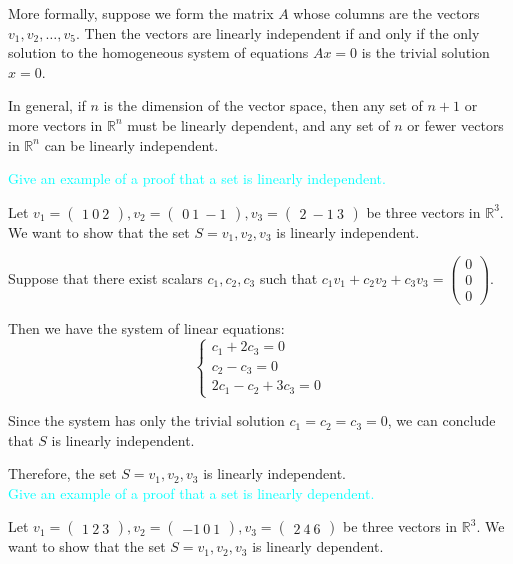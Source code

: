 \documentclass[fontsize=12pt]{scrartcl}
\begin{document}
\noindent
More formally, suppose we form the matrix $A$ whose columns are the vectors $v_1, v_2, \ldots, v_5$. Then the vectors are linearly independent if and only if the only solution to the homogeneous system of equations $Ax=0$ is the trivial solution $x=0$.

\noindent
In general, if $n$ is the dimension of the vector space, then any set of $n+1$ or more vectors in $\mathbb{R}^n$ must be linearly dependent, and any set of $n$ or fewer vectors in $\mathbb{R}^n$ can be linearly independent.

\newpage

\noindent
\textcolor{cyan}{Give an example of a proof that a set is linearly independent.}

\noindent
Let $v_1 = \begin{pmatrix} 1 \ 0 \ 2 \end{pmatrix}, v_2 = \begin{pmatrix} 0 \ 1 \ -1 \end{pmatrix}, v_3 = \begin{pmatrix} 2 \ -1 \ 3 \end{pmatrix}$ be three vectors in $\mathbb{R}^3$. We want to show that the set $S = {v_1, v_2, v_3}$ is linearly independent.

\noindent
Suppose that there exist scalars $c_1, c_2, c_3$ such that $c_1v_1+c_2v_2+c_3v_3 = \left(\begin{array}{c} 0 \\ 0 \\ 0
\end{array} \right).$

\noindent
Then we have the system of linear equations: $$\left\{ \begin{array}{rcl} c_1 + 2c_3 = 0 \\ c_2 - c_3 = 0 \\ 2c_1 - c_2 + 3c_3 = 0 \end{array} \right.$$

\noindent
Since the system has only the trivial solution $c_1 = c_2 = c_3 = 0$, we can conclude that $S$ is linearly independent.

\noindent
Therefore, the set $S = {v_1, v_2, v_3}$ is linearly independent.\\

\noindent
\textcolor{cyan}{Give an example of a proof that a set is linearly dependent.}

\noindent
Let $v_1 = \begin{pmatrix} 1 \ 2 \ 3 \end{pmatrix}, v_2 = \begin{pmatrix} -1 \ 0 \ 1 \end{pmatrix}, v_3 = \begin{pmatrix} 2 \ 4 \ 6 \end{pmatrix}$ be three vectors in $\mathbb{R}^3$. We want to show that the set $S = {v_1, v_2, v_3}$ is linearly dependent.
\end{document}

